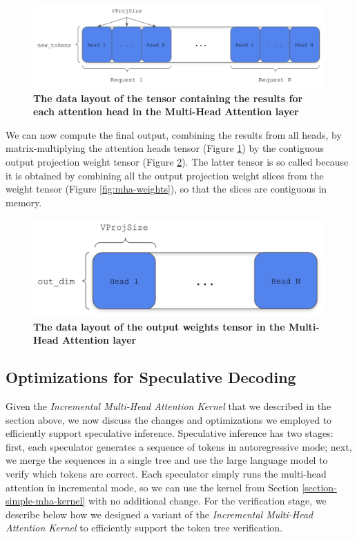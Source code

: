 \begin{figure}[H]
    \centering
    \includegraphics[width=\linewidth]{figures/attn_heads2.png}
    \caption{\textbf{The data layout of the tensor containing the results for each attention head in the Multi-Head Attention layer}}
    \label{fig:mha-attn-head}
\end{figure}

We can now compute the final output, combining the results from all heads, by matrix-multiplying the attention heads tensor (Figure \ref{fig:mha-attn-head}) by the contiguous output projection weight tensor (Figure \ref{fig:w-out}). The latter tensor is so called because it is obtained by combining all the output projection weight slices from the weight tensor (Figure \ref{fig:mha-weights}), so that the slices are contiguous in memory.

\begin{figure}[H]
    \centering
    \includegraphics[width=\linewidth]{figures/w_out-contiguous2.png}
    \caption{\textbf{The data layout of the output weights tensor in the Multi-Head Attention layer}}
    \label{fig:w-out}
\end{figure}

\subsection{Optimizations for Speculative Decoding}
Given the \textit{Incremental Multi-Head Attention Kernel} that we described in the section above, we now discuss the changes and optimizations we employed to efficiently support speculative inference. Speculative inference has two stages: first, each speculator generates a sequence of tokens in autoregressive mode; next, we merge the sequences in a single tree and use the large language model to verify which tokens are correct. Each speculator simply runs the multi-head attention in incremental mode, so we can use the kernel from Section \ref{section-simple-mha-kernel} with no additional change. For the verification stage, we describe below how we designed a variant of the \textit{Incremental Multi-Head Attention Kernel} to efficiently support the token tree verification.

